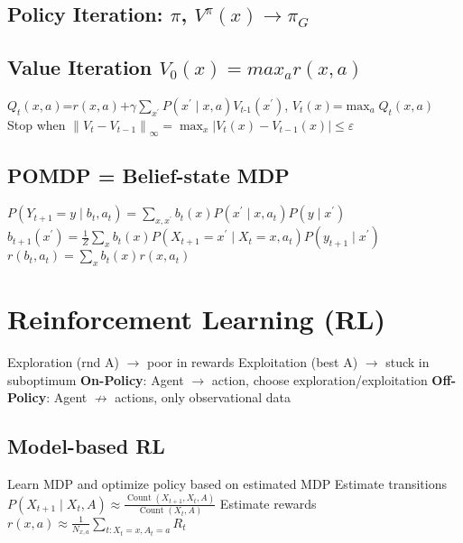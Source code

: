 \documentclass[a4paper, 11pt, landscape]{article}
\begin{document}
\begin{multicols*}{3}
\subsection{Policy Iteration: $\pi$, $V^{\pi}(x) \rightarrow \pi_G$}

\subsection{Value Iteration $V_0(x) = max_a r(x, a)$}
$Q_{t}(x, a)\text{=}r(x, a)\text{+}\gamma \sum_{x^{\prime}} P\left(x^{\prime} \mid x, a\right) V_{t\text{-}1}\left(x^{\prime}\right)$, $V_{t}(x)\text{=}\max _{a} Q_{t}(x, a)$
\newline Stop when $\left\|V_{t}-V_{t-1}\right\|_{\infty}=\max _{x}\left|V_{t}(x)-V_{t-1}(x)\right| \leq \varepsilon$

\subsection{POMDP = Belief-state MDP}
$P\left(Y_{t+1}=y \mid b_{t}, a_{t}\right)=\sum_{x, x^{\prime}} b_{t}(x) P\left(x^{\prime} \mid x, a_{t}\right) P\left(y \mid x^{\prime}\right)$
\newline $b_{t+1}\left(x^{\prime}\right)=\frac{1}{Z} \sum_{x} b_{t}(x) P\left(X_{t+1}=x^{\prime} \mid X_{t}=x, a_{t}\right) P\left(y_{t+1} \mid x^{\prime}\right)$
\newline $r\left(b_{t}, a_{t}\right)=\sum_{x} b_{t}(x) r\left(x, a_{t}\right)$

\section{Reinforcement Learning (RL)}
Exploration (rnd A) $\rightarrow$ poor in rewards
\newline Exploitation (best A) $\rightarrow$ stuck in suboptimum
\newline \textbf{On-Policy}: Agent $\to$ action, choose exploration/exploitation
\newline \textbf{Off-Policy}: Agent $\not\to$ actions, only observational data

\subsection{Model-based RL}
Learn MDP and optimize policy based on estimated MDP
\newline Estimate transitions $P\left(X_{t+1} \mid X_{t}, A\right) \approx \frac{\operatorname{Count}\left(X_{t+1}, X_{t}, A\right)}{\operatorname{Count}\left(X_{t}, A\right)}$
\newline Estimate rewards $r(x, a) \approx \frac{1}{N_{x, a}} \sum_{t: X_{t}=x, A_{t}=a} R_{t}$


\end{multicols*}
\end{document}
